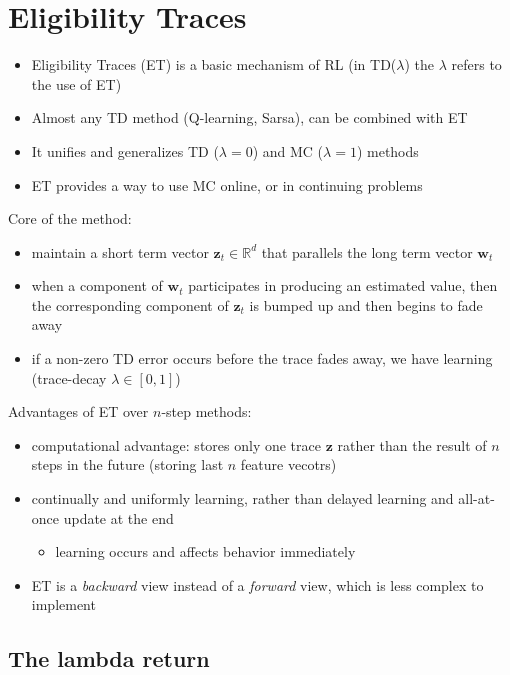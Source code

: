 \documentclass[sutton_barto_notes.tex]{subfiles}
\begin{document}
\newpage
\section{Eligibility Traces}

\begin{itemize}
\item Eligibility Traces (ET) is a basic mechanism of RL (in TD($\lambda$) the $\lambda$ refers to the use of ET) 
\item Almost any TD method (Q-learning, Sarsa), can be combined with ET 
\item It unifies and generalizes TD ($\lambda = 0$) and MC ($\lambda = 1$) methods 
\item ET provides a way to use MC online, or in continuing problems 
\end{itemize}

 Core of the method: 
\begin{itemize}
\item maintain a short term vector $\mathbf{z}_t \in \mathbb{R}^d$ that parallels the long term vector $\mathbf{w}_t$ 
\item when a component of $\mathbf{w}_t$ participates in producing an estimated value, then the corresponding component of $\mathbf{z}_t$ is bumped up and then begins to fade away 
\item if a non-zero TD error occurs before the trace fades away, we have learning (trace-decay $\lambda \in [0, 1]$) 
\end{itemize}

Advantages of ET over $n$-step methods: 
\begin{itemize}
\item computational advantage: stores only one trace $\mathbf{z}$ rather than the result of $n$ steps in the future (storing last $n$ feature vecotrs)
\item continually and uniformly learning, rather than delayed learning and all-at-once update at the end
\begin{itemize}
	\item learning occurs and affects behavior immediately
\end{itemize}
\item ET is a \textit{backward} view instead of a \textit{forward} view, which is less complex to implement 
\end{itemize}

\subsection{The lambda return}
\end{document}
